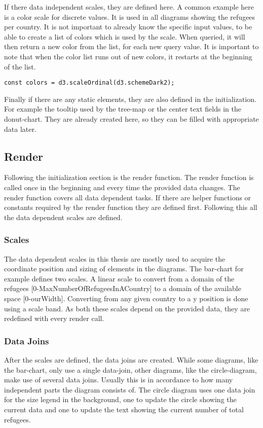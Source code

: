 If there data independent scales, they are defined here. A common example here is a color scale for discrete values. It is used in all diagrams showing the refugees per country. It is not important to already know the specific input values, to be able to create a list of colors which is used by the scale. When queried, it will then return a new color from the list, for each new query value. It is important to note that when the color list runs out of new colors, it restarts at the beginning of the list.

\begin{minipage}{\linewidth}
\begin{lstlisting}[style=htmlcssjs, caption={Definition of data independent color scale}, label={color_scale}]
const colors = d3.scaleOrdinal(d3.schemeDark2);
\end{lstlisting}
\end{minipage}

Finally if there are any static elements, they are also defined in the initialization. For example the tooltip used by the tree-map or the center text fields in the donut-chart. They are already created here, so they can be filled with appropriate data later.

\subsection{Render}
Following the initialization section is the render function. The render function is called once in the beginning and every time the provided data changes. The render function covers all data dependent tasks. If there are helper functions or constants required by the render function they are defined first. Following this all the data dependent scales are defined.

\subsubsection{Scales}
The data dependent scales in this thesis are mostly used to acquire the coordinate position and sizing of elements in the diagrams. The bar-chart for example defines two scales. A linear scale to convert from a domain of the refugees [0-MaxNumberOfRefugeesInACountry] to a domain of the available space [0-ourWidth]. Converting from any given country to a y position is done using a scale band. As both these scales depend on the provided data, they are redefined with every render call.

\subsubsection{Data Joins}
After the scales are defined, the data joins are created. While some diagrams, like the bar-chart, only use a single data-join, other diagrams, like the circle-diagram, make use of several data joins. Usually this is in accordance to how many independent parts the diagram consists of. The circle diagram uses one data join for the size legend in the background, one to update the circle showing the current data and one to update the text showing the current number of total refugees.

